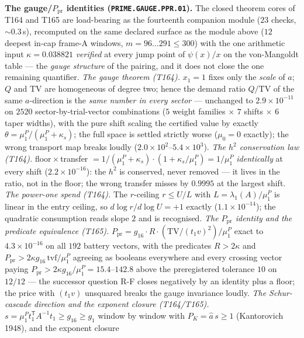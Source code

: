 \documentclass[11pt,a4paper]{article}
\theoremstyle{definition}
\begin{document}
\par\smallskip\noindent\textbf{The gauge/$P_{\mathrm{pr}}$ identities
(\texttt{PRIME.GAUGE.PPR.01}).}
The closed theorem cores of T164 and T165 are load-bearing as the
fourteenth companion module ($23$ checks, ${\sim}0.3$\,s), recomputed on
the same declared surface as the module above ($12$ deepest in-cap
frame-A windows, $m=96\ldots291\le300$) with the one arithmetic input
$\kappa=0.038821$ \emph{verified} at every jump point of $\psi(x)/x$ on
the von-Mangoldt table --- the \emph{gauge structure} of the pairing,
and it does not close the one remaining quantifier.
\emph{The gauge theorem (T164).} $x_1=1$ fixes only the \emph{scale} of
$a$; $Q$ and TV are homogeneous of degree two; hence the demand ratio
$Q/\mathrm{TV}$ of the same $a$-direction is the \emph{same number in
every sector} --- unchanged to $2.9\times10^{-11}$ on $2520$
sector-by-trial-vector combinations ($5$ weight families $\times$ $7$
shifts $\times$ $6$ taper widths), with the pure shift scaling the
certified value by exactly $\theta=\mu^P_1/(\mu^P_1+\kappa_s)$; the full
space is settled strictly worse ($\mu_0=0$ exactly); the wrong transport
map breaks loudly ($2.0\times10^{2}$--$5.4\times10^{3}$).
\emph{The $h^2$ conservation law (T164).}
floor${}\times{}$transfer $=1/(\mu^P_1+\kappa_s)\cdot(1+\kappa_s/\mu^P_1)
=1/\mu^P_1$ \emph{identically} at every shift ($2.2\times10^{-16}$): the
$h^2$ is conserved, never removed --- it lives in the ratio, not in the
floor; the wrong transfer misses by $0.9995$ at the largest shift.
\emph{The power-one spend (T164).} The $r$-ceiling $r\le U/L$ with
$L=\lambda_1(A)/\mu^P_1$ is linear in the entry ceiling, so
$d\log r/d\log U=+1$ exactly ($1.1\times10^{-14}$); the quadratic
consumption reads slope $2$ and is recognised.
\emph{The $P_{\mathrm{pr}}$ identity and the predicate equivalence
(T165).} $P_{\mathrm{pr}}=g_{16}\cdot R\cdot(\mathrm{TV}/(t_1v)^2)/\mu^P_1$
exact to $4.3\times10^{-16}$ on all $192$ battery vectors, with the
predicates $R>2\kappa$ and
$P_{\mathrm{pr}}>2\kappa g_{16}\,\mathrm{tvf}/\mu^P_1$ agreeing as
booleans everywhere and every crossing vector paying
$P_{\mathrm{pr}}>2\kappa g_{16}/\mu^P_1=15.4$--$142.8$ above the
preregistered tolerance $10$ on $12/12$ --- the successor question R-F
closes negatively by an identity plus a floor; the price with $(t_1v)$
unsquared breaks the gauge invariance loudly.
\emph{The Schur-cascade direction and the exponent closure (T164/T165).}
$s=\mu^P_1t_1^{\mathsf T}A^{-1}t_1\ge g_{16}\ge g_1$ window by window
with $P_K=\hat a\,s\ge1$ (Kantorovich 1948), and the exponent closure
\end{document}
